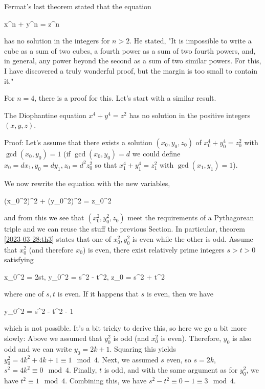 Fermat's last theorem stated that the equation

\bee
x^n + y^n = z^n
\eee

has no solution in the integers for $n > 2$. He stated, "It is impossible to write a cube as a sum of two cubes, a fourth power as a sum of two fourth powers, and, in general, any power beyond the second as a sum of two similar powers. For this, I have discovered a truly wonderful proof, but the margin is too small to contain it."

For $n=4$, there is a proof for this. Let's start with a similar result.

\begin{theorem}
    The Diophantine equation $x^4 + y^4 = z^2$ has no solution in the positive integers $(x,y,z)$.
\end{theorem}

Proof: Let's assume that there exists a solution $(x_0, y_0, z_0)$ of $x_0^4 + y_0^4 = z_0^2$ with $\gcd(x_0, y_0) = 1$ (if $\gcd(x_0, y_0) = d$ we could define $x_0 = d x_1, y_0 = d y_1, z_0 = d^2 z_0^2$ so that $x_1^4 + y_1^4 = z_1^2$ with $\gcd(x_1, y_1) = 1$).

We now rewrite the equation with the new variables,

\bee
(x_0^2)^2 + (y_0^2)^2 = z_0^2
\eee

and from this we see that $(x_0^2, y_0^2, z_0)$ meet the requirements of a Pythagorean triple and we can reuse the stuff the previous Section. In particular, theorem \ref{2023-03-28:th3} states that one of $x_0^2, y_0^2$ is even while the other is odd. Assume that $x_0^2$ (and therefore $x_0$) is even, there exist relatively prime integers $s > t > 0$ satisfying

\bee
x_0^2 = 2st, \quad y_0^2 = s^2 - t^2, \quad z_0 = s^2 + t^2
\eee

where one of $s, t$ is even. If it happens that $s$ is even, then we have

 \equiv y_0^2 = s^2 - t^2  - 1  
\eee

which is not possible. It's a bit tricky to derive this, so here we go a bit more slowly: Above we assumed that $y_0^2$ is odd (and $x_0^2$ is even). Therefore, $y_0$ is also odd and we can write $y_0 = 2k+1$. Squaring this yields $y_0^2 = 4k^2 + 4k + 1 \equiv 1 \mod 4$. Next, we assumed $s$ even, so $s = 2k$, $s^2 = 4k^2 \equiv 0 \mod 4$. Finally, $t$ is odd, and with the same argument as for $y_0^2$, we have $t^2 \equiv 1 \mod 4$. Combining this, we have $s^2 - t^2 \equiv 0 - 1 \equiv 3 \mod 4$.

